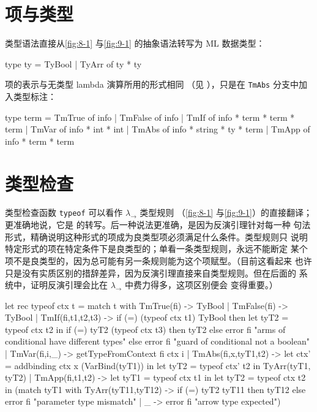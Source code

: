 \section{项与类型}
\label{sec:10.2}

类型语法直接从\cref{fig:8-1} 与\cref{fig:9-1} 的抽象语法转写为
ML 数据类型：
\begin{taplocamlcode}
type ty =
    TyBool
  | TyArr of ty * ty
\end{taplocamlcode}

项的表示与无类型 lambda 演算所用的形式相同
（见 ），只是在
\texttt{TmAbs} 分支中加入类型标注：
\begin{taplocamlcode}
type term =
    TmTrue of info
  | TmFalse of info
  | TmIf of info * term * term * term
  | TmVar of info * int * int
  | TmAbs of info * string * ty * term
  | TmApp of info * term * term
\end{taplocamlcode}

\section{类型检查}
\label{sec:10.3}

类型检查函数 \texttt{typeof} 可以看作 \(\lambda_{\to}\) 类型规则
（\cref{fig:8-1} 与\cref{fig:9-1}）的直接翻译；更准确地说，它是
的转写。后一种说法更准确，是因为反演引理针对每一种
句法形式，精确说明这种形式的项成为良类型项必须满足什么条件。类型规则只
说明特定形式的项在特定条件下是良类型的；单看一条类型规则，永远不能断定
某个项不是良类型的，因为总可能有另一条规则能为这个项赋型。（目前这看起来
也许只是没有实质区别的措辞差异，因为反演引理直接来自类型规则。但在后面的
系统中，证明反演引理会比在 \(\lambda_{\to}\) 中费力得多，这项区别便会
变得重要。）

\begin{taplocamlcode}
let rec typeof ctx t =
  match t with
    TmTrue(fi) ->
      TyBool
  | TmFalse(fi) ->
      TyBool
  | TmIf(fi,t1,t2,t3) ->
      if (=) (typeof ctx t1) TyBool then
        let tyT2 = typeof ctx t2 in
        if (=) tyT2 (typeof ctx t3) then tyT2
        else error fi "arms of conditional have different types"
      else error fi "guard of conditional not a boolean"
  | TmVar(fi,i,_) ->
      getTypeFromContext fi ctx i
  | TmAbs(fi,x,tyT1,t2) ->
      let ctx' = addbinding ctx x (VarBind(tyT1)) in
      let tyT2 = typeof ctx' t2 in
      TyArr(tyT1, tyT2)
  | TmApp(fi,t1,t2) ->
      let tyT1 = typeof ctx t1 in
      let tyT2 = typeof ctx t2 in
      (match tyT1 with
         TyArr(tyT11,tyT12) ->
           if (=) tyT2 tyT11 then tyT12
           else error fi "parameter type mismatch"
       | _ -> error fi "arrow type expected")
\end{taplocamlcode}

